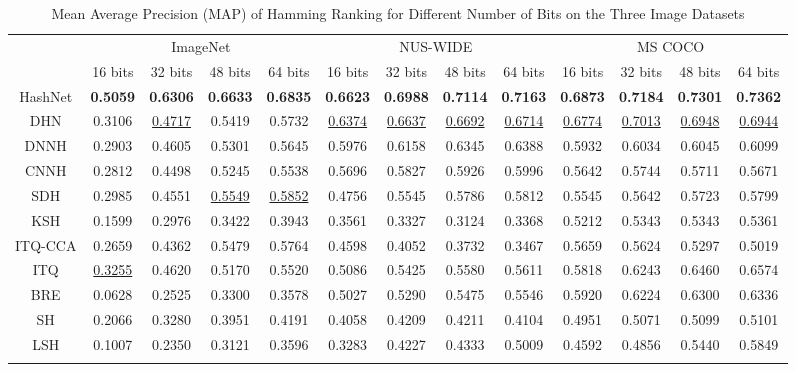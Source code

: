\documentclass[10pt,twocolumn,letterpaper]{article}
\begin{document}
\begin{table*}[tb]
    \centering 
    \addtolength{\tabcolsep}{-2pt}
    \caption{Mean Average Precision (MAP) of Hamming Ranking for Different Number of Bits on the Three Image Datasets}
    \label{table:MAP}
    \begin{tabular}{c|cccc|cccc|cccc}
        \Xhline{1.0pt}
        \multirow{2}{30pt}{\centering Method} & \multicolumn{4}{c|}{ImageNet} & \multicolumn{4}{c|}{NUS-WIDE} & \multicolumn{4}{c}{MS COCO} \\
        \cline{2-13}
        & 16 bits & 32 bits  & 48 bits  & 64 bits  & 16 bits & 32 bits  & 48 bits  & 64 bits  & 16 bits & 32 bits  & 48 bits  & 64 bits \\
        \hline
        HashNet & \textbf{0.5059} & \textbf{0.6306} & \textbf{0.6633} & \textbf{0.6835} & \textbf{0.6623} & \textbf{0.6988} & \textbf{0.7114} & \textbf{0.7163} & \textbf{0.6873} & \textbf{0.7184} & \textbf{0.7301} & \textbf{0.7362} \\
        DHN \cite{cite:AAAI16DHN} & 0.3106 & \underline{0.4717} & 0.5419 & 0.5732 & \underline{0.6374} & \underline{0.6637} & \underline{0.6692} & \underline{0.6714} & \underline{0.6774} & \underline{0.7013} & \underline{0.6948} & \underline{0.6944} \\
        DNNH \cite{cite:CVPR15DNNH} & 0.2903 & 0.4605 & 0.5301 & 0.5645 & 0.5976 & 0.6158 & 0.6345 & 0.6388 & 0.5932 & 0.6034 & 0.6045 & 0.6099 \\
        CNNH \cite{cite:AAAI14CNNH} & 0.2812 & 0.4498 & 0.5245 & 0.5538 & 0.5696 & 0.5827 & 0.5926 & 0.5996 & 0.5642 & 0.5744 & 0.5711 & 0.5671 \\
        SDH \cite{cite:CVPR15SDH} & 0.2985 & 0.4551 & \underline{0.5549} & \underline{0.5852} & 0.4756 & 0.5545 & 0.5786 & 0.5812 & 0.5545 & 0.5642 & 0.5723 & 0.5799 \\
        KSH \cite{cite:CVPR12KSH} & 0.1599 & 0.2976 & 0.3422 & 0.3943 & 0.3561 & 0.3327 & 0.3124 & 0.3368 & 0.5212 & 0.5343 & 0.5343 & 0.5361 \\
        ITQ-CCA \cite{cite:CVPR11ITQ} & 0.2659 & 0.4362 & 0.5479 & 0.5764 & 0.4598 & 0.4052 & 0.3732 & 0.3467 & 0.5659 & 0.5624 & 0.5297 & 0.5019 \\
        ITQ \cite{cite:CVPR11ITQ} & \underline{0.3255} & 0.4620 & 0.5170 & 0.5520 & 0.5086 & 0.5425 & 0.5580 & 0.5611 & 0.5818 & 0.6243 & 0.6460 & 0.6574 \\
        BRE \cite{cite:NIPS09BRE} & 0.0628 & 0.2525 & 0.3300 & 0.3578 & 0.5027 & 0.5290 & 0.5475 & 0.5546 & 0.5920 & 0.6224 & 0.6300 & 0.6336 \\
        SH \cite{cite:NIPS09SH} & 0.2066 & 0.3280 & 0.3951 & 0.4191 & 0.4058 & 0.4209 & 0.4211 & 0.4104 & 0.4951 & 0.5071 & 0.5099 & 0.5101 \\
        LSH \cite{cite:VLDB99LSH} & 0.1007 & 0.2350 & 0.3121 & 0.3596 & 0.3283 & 0.4227 & 0.4333 & 0.5009 & 0.4592 & 0.4856 & 0.5440 & 0.5849 \\
        \Xhline{1.0pt}
    \end{tabular}
\end{table*}
\end{document}
